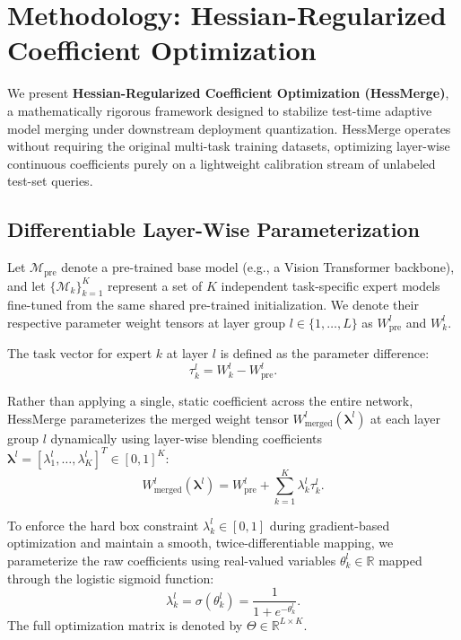 \section{Methodology: Hessian-Regularized Coefficient Optimization}
\label{sec:methodology}

We present \textbf{Hessian-Regularized Coefficient Optimization (HessMerge)}, a mathematically rigorous framework designed to stabilize test-time adaptive model merging under downstream deployment quantization. HessMerge operates without requiring the original multi-task training datasets, optimizing layer-wise continuous coefficients purely on a lightweight calibration stream of unlabeled test-set queries.

\subsection{Differentiable Layer-Wise Parameterization}
Let $\mathcal{M}_{\text{pre}}$ denote a pre-trained base model (e.g., a Vision Transformer backbone), and let $\{\mathcal{M}_k\}_{k=1}^K$ represent a set of $K$ independent task-specific expert models fine-tuned from the same shared pre-trained initialization. We denote their respective parameter weight tensors at layer group $l \in \{1, \dots, L\}$ as $W_{\text{pre}}^l$ and $W_k^l$. 

The task vector for expert $k$ at layer $l$ is defined as the parameter difference:
\begin{equation}
    \tau_k^l = W_k^l - W_{\text{pre}}^l.
\end{equation}

Rather than applying a single, static coefficient across the entire network, HessMerge parameterizes the merged weight tensor $W_{\text{merged}}^l(\boldsymbol{\lambda}^l)$ at each layer group $l$ dynamically using layer-wise blending coefficients $\boldsymbol{\lambda}^l = [\lambda_1^l, \dots, \lambda_K^l]^T \in [0, 1]^K$:
\begin{equation}
    W_{\text{merged}}^l(\boldsymbol{\lambda}^l) = W_{\text{pre}}^l + \sum_{k=1}^K \lambda_k^l \tau_k^l.
\end{equation}

To enforce the hard box constraint $\lambda_k^l \in [0, 1]$ during gradient-based optimization and maintain a smooth, twice-differentiable mapping, we parameterize the raw coefficients using real-valued variables $\theta_k^l \in \mathbb{R}$ mapped through the logistic sigmoid function:
\begin{equation}
    \lambda_k^l = \sigma(\theta_k^l) = \frac{1}{1 + e^{-\theta_k^l}}.
\end{equation}
The full optimization matrix is denoted by $\Theta \in \mathbb{R}^{L \times K}$.

